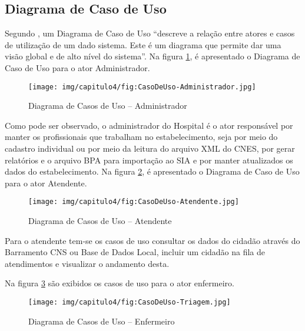 \subsection{\textbf{Diagrama de Caso de Uso}}

Segundo , um Diagrama de Caso de Uso ``descreve a relação entre atores e casos de utilização de um dado sistema. Este é um diagrama que permite dar uma visão global e de alto nível do sistema''. Na figura \ref{fig:CasoDeUso-Administrador}, é apresentado o Diagrama de Caso de Uso para o ator Administrador.

\begin{figure}[H]
    \centering
     \caption{Diagrama de Casos de Uso – Administrador}
    \texttt{[image: img/capitulo4/fig:CasoDeUso-Administrador.jpg]}
    \label{fig:CasoDeUso-Administrador}
\end{figure}

Como pode ser observado,  o administrador do Hospital é o ator responsável por manter os profissionais que trabalham no estabelecimento, seja por meio do cadastro individual ou por meio da leitura do arquivo XML do CNES, por gerar relatórios e o arquivo BPA para importação ao SIA e por manter atualizados os dados do estabelecimento. Na figura \ref{fig:CasoDeUso-Atendente}, é apresentado o Diagrama de Caso de Uso para o ator Atendente.

\begin{figure}[H]
    \centering
     \caption{Diagrama de Casos de Uso – Atendente}
    \texttt{[image: img/capitulo4/fig:CasoDeUso-Atendente.jpg]}
    \label{fig:CasoDeUso-Atendente}
\end{figure}

Para o atendente tem-se os casos de uso consultar os dados do cidadão através do Barramento CNS ou Base de Dados Local, incluir um cidadão na fila de atendimentos e visualizar o andamento desta.

Na figura \ref{fig:CasoDeUso-Triagem} são exibidos os casos de uso para o ator enfermeiro.

\begin{figure}[H]
    \centering
     \caption{Diagrama de Casos de Uso – Enfermeiro} 
    \texttt{[image: img/capitulo4/fig:CasoDeUso-Triagem.jpg]}
    \label{fig:CasoDeUso-Triagem}
\end{figure}

